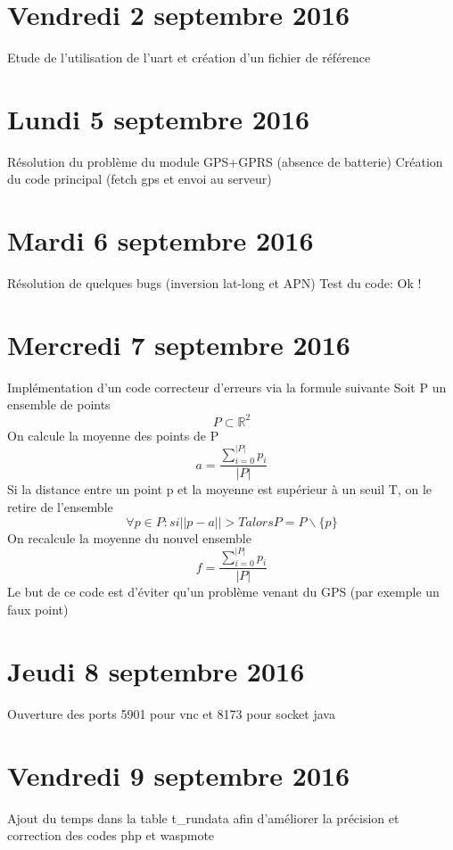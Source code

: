 \documentclass[a4paper,11pt]{article}
\begin{document}
\section{Vendredi 2 septembre 2016}
Etude de l'utilisation de l'uart et création d'un fichier de référence

\section{Lundi 5 septembre 2016}
Résolution du problème du module GPS+GPRS (absence de batterie) \newline
Création du code principal (fetch gps et envoi au serveur) \newline

\section{Mardi 6 septembre 2016}
Résolution de quelques bugs (inversion lat-long et APN) \newline
Test du code: Ok !

\section{Mercredi 7 septembre 2016}
Implémentation d'un code correcteur d'erreurs via la formule suivante
Soit P un ensemble de points
\begin{equation*}
P \subset \mathbb{R}^2
\end{equation*}
On calcule la moyenne des points de P
\begin{equation*}
a = \frac{\sum\limits_{i=0}^{|P|} p_i}{|P|}
\end{equation*}
Si la distance entre un point p et la moyenne est supérieur à un seuil T, on le retire de l'ensemble
\begin{equation*}
\forall p \in P : si ||p-a|| > T  alors  P = P\backslash\{p\}
\end{equation*}
On recalcule la moyenne du nouvel ensemble
\begin{equation*}
f = \frac{\sum\limits_{i=0}^{|P|} p_i}{|P|}
\end{equation*}
Le but de ce code est d'éviter qu'un problème venant du GPS (par exemple un faux point)

\section{Jeudi 8 septembre 2016}
Ouverture des ports 5901 pour vnc et 8173 pour socket java

\section{Vendredi 9 septembre 2016}
Ajout du temps dans la table t\_rundata afin d'améliorer la précision et correction des codes php et waspmote
\end{document}
